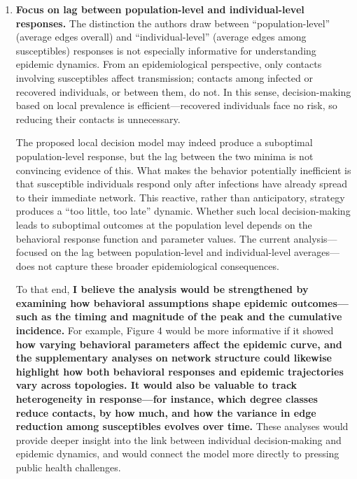 \documentclass{article}
\begin{document}
\begin{enumerate}
    \item {\bf Focus on lag between population-level and individual-level responses.}
    The distinction the authors draw between “population-level” (average edges overall) and “individual-level” (average edges among susceptibles) responses is not especially informative for understanding epidemic dynamics. From an epidemiological perspective, only contacts involving susceptibles affect transmission; contacts among infected or recovered individuals, or between them, do not. In this sense, decision-making based on local prevalence is efficient—recovered individuals face no risk, so reducing their contacts is unnecessary.

    The proposed local decision model may indeed produce a suboptimal population-level response, but the lag between the two minima is not convincing evidence of this. What makes the behavior potentially inefficient is that susceptible individuals respond only after infections have already spread to their immediate network. This reactive, rather than anticipatory, strategy produces a “too little, too late” dynamic. Whether such local decision-making leads to suboptimal outcomes at the population level depends on the behavioral response function and parameter values. The current analysis—focused on the lag between population-level and individual-level averages—does not capture these broader epidemiological consequences.

    To that end, 
    {\bf 
    I believe the analysis would be strengthened by examining how behavioral assumptions shape epidemic outcomes—such as the timing and magnitude of the peak and the cumulative incidence.
    }
    For example, Figure 4 would be more informative if it showed 
    {\bf 
    how varying behavioral parameters affect the epidemic curve, and the supplementary analyses on network structure could likewise highlight how both behavioral responses and epidemic trajectories vary across topologies.
    It would also be valuable to track heterogeneity in response—for instance, which degree classes reduce contacts, by how much, and how the variance in edge reduction among susceptibles evolves over time.
    }
    These analyses would provide deeper insight into the link between individual decision-making and epidemic dynamics, and would connect the model more directly to pressing public health challenges.


\end{enumerate}
\end{document}

